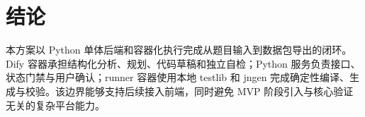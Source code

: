\documentclass[UTF8,zihao=-4]{ctexart}
\begin{document}
\section{结论}

本方案以 Python 单体后端和容器化执行完成从题目输入到数据包导出的闭环。Dify 容器承担结构化分析、规划、代码草稿和独立自检；Python 服务负责接口、状态门禁与用户确认；runner 容器使用本地 testlib 和 jngen 完成确定性编译、生成与校验。该边界能够支持后续接入前端，同时避免 MVP 阶段引入与核心验证无关的复杂平台能力。
\end{document}

